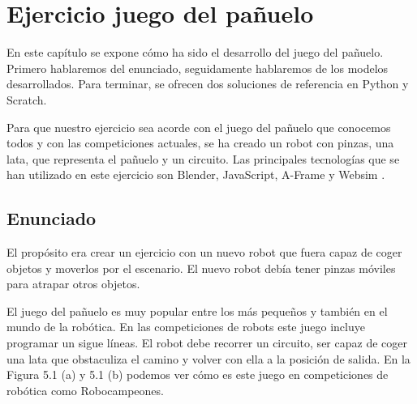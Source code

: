 \chapter{Ejercicio juego del pañuelo} \label{gripper}
En este capítulo se expone cómo ha sido el desarrollo del juego del pañuelo. Primero hablaremos del enunciado, seguidamente hablaremos de los modelos desarrollados. Para terminar, se ofrecen dos soluciones de referencia en Python y Scratch.

Para que nuestro ejercicio sea acorde con el juego del pañuelo que conocemos todos y con las competiciones actuales, se ha creado un robot con pinzas, una lata, que representa el pañuelo y un circuito. Las principales tecnologías que se han utilizado en este ejercicio son Blender, JavaScript, A-Frame y Websim .


\section{Enunciado}
El propósito era crear un ejercicio con un nuevo robot que fuera capaz de coger objetos y moverlos por el escenario. El nuevo robot debía tener pinzas móviles para atrapar otros objetos. 

El juego del pañuelo es muy popular entre los más pequeños y también en el mundo de la robótica. En las competiciones de robots este juego incluye programar un sigue líneas. El robot debe recorrer un circuito, ser capaz de coger una lata que obstaculiza el camino y volver con ella a la posición de salida. En la Figura 5.1 (a) y 5.1 (b) podemos ver cómo es este juego en competiciones de robótica como Robocampeones.

